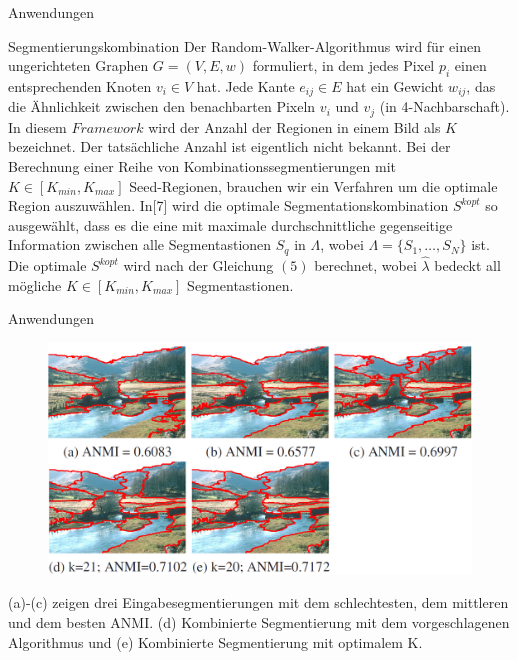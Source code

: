 \documentclass{beamer}
\begin{document}
\begin{frame}{Anwendungen}
	\begin{block}{Segmentierungskombination}
		Der Random-Walker-Algorithmus wird für einen
		ungerichteten Graphen $G = (V, E, w)$ formuliert, in dem jedes Pixel
		$p_i$ einen entsprechenden Knoten $v_i \in V$ hat. Jede Kante $e_{ij} \in E$  hat ein Gewicht $w_{ij}$, das die Ähnlichkeit zwischen den benachbarten Pixeln $v_i$ und $v_j$  (in 4-Nachbarschaft). In diesem $Framework$ wird der Anzahl der Regionen in einem Bild als $K$ bezeichnet. Der tatsächliche Anzahl ist eigentlich nicht bekannt. Bei der Berechnung einer Reihe von Kombinationssegmentierungen
		mit $K \in [K_{min}, K_{max}]$ Seed-Regionen, brauchen wir ein Verfahren um
		die optimale Region auszuwählen. In[7] wird die optimale Segmentationskombination $S^{kopt}$ so ausgewählt, dass es die eine mit maximale durchschnittliche gegenseitige Information zwischen alle Segmentastionen $S_q$ in $\Lambda$, wobei $\Lambda  = \{S_1, \ldots ,S_N\}$ ist. Die optimale $S^{kopt}$ wird nach der Gleichung $(5)$ berechnet, wobei $\hat{\lambda}$ bedeckt all mögliche  $K \in [K_{min}, K_{max}]$  Segmentastionen.
	\end{block}
\end{frame}
\begin{frame}{Anwendungen}
	\begin{figure}[h]
		\includegraphics[width=0.7\linewidth,height=0.4\linewidth]{pic8}
	\end{figure}
(a)-(c) zeigen drei Eingabesegmentierungen mit
dem schlechtesten, dem mittleren und dem besten ANMI. (d)
Kombinierte Segmentierung mit dem vorgeschlagenen Algorithmus und
(e) Kombinierte Segmentierung mit optimalem K.
\end{frame}
\end{document}
